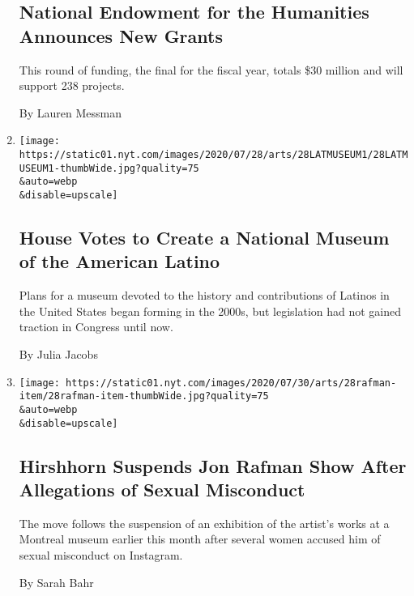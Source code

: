 \begin{enumerate}
  \hypertarget{national-endowment-for-the-humanities-announces-new-grants}{%
  \subsection{National Endowment for the Humanities Announces New
  Grants}\label{national-endowment-for-the-humanities-announces-new-grants}}

  This round of funding, the final for the fiscal year, totals \$30
  million and will support 238 projects.

  By Lauren Messman
\item
  \href{/2020/07/28/arts/design/national-museum-of-the-american-latino.html}{}

  \texttt{[image: https://static01.nyt.com/images/2020/07/28/arts/28LATMUSEUM1/28LATMUSEUM1-thumbWide.jpg?quality=75\\\&auto=webp\\\&disable=upscale]}

  \hypertarget{house-votes-to-create-a-national-museum-of-the-american-latino}{%
  \subsection{House Votes to Create a National Museum of the American
  Latino}\label{house-votes-to-create-a-national-museum-of-the-american-latino}}

  Plans for a museum devoted to the history and contributions of Latinos
  in the United States began forming in the 2000s, but legislation had
  not gained traction in Congress until now.

  By Julia Jacobs
\item
  \href{/2020/07/28/arts/design/hirshhorn-museum-jon-rafman.html}{}

  \texttt{[image: https://static01.nyt.com/images/2020/07/30/arts/28rafman-item/28rafman-item-thumbWide.jpg?quality=75\\\&auto=webp\\\&disable=upscale]}

  \hypertarget{hirshhorn-suspends-jon-rafman-show-after-allegations-of-sexual-misconduct}{%
  \subsection{Hirshhorn Suspends Jon Rafman Show After Allegations of
  Sexual
  Misconduct}\label{hirshhorn-suspends-jon-rafman-show-after-allegations-of-sexual-misconduct}}

  The move follows the suspension of an exhibition of the artist's works
  at a Montreal museum earlier this month after several women accused
  him of sexual misconduct on Instagram.

  By Sarah Bahr
\end{enumerate}

